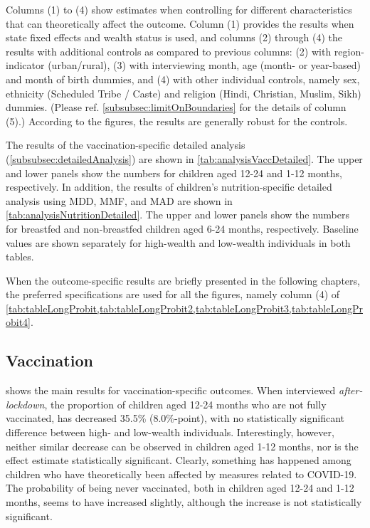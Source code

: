 \documentclass[12pt,a4paper,notitlepage]{article}
\begin{document}
Columns (1) to (4) show estimates when controlling for different characteristics that can theoretically affect the outcome. Column (1) provides the results when state fixed effects and wealth status is used, and columns (2) through (4) the results with additional controls as compared to previous columns: (2) with region-indicator (urban/rural), (3) with interviewing month, age (month- or year-based) and month of birth dummies, and (4) with other individual controls, namely sex, ethnicity (Scheduled Tribe /  Caste) and religion (Hindi, Christian, Muslim, Sikh) dummies. (Please ref. \cref{subsubsec:limitOnBoundaries} for the details of column (5).) According to the figures, the results are generally robust for the controls.

The results of the vaccination-specific detailed analysis (\cref{subsubsec:detailedAnalysis}) are shown in \cref{tab:analysisVaccDetailed}. The upper and lower panels show the numbers for children aged 12-24 and 1-12 months, respectively. In addition, the results of children's nutrition-specific detailed analysis using MDD, MMF, and MAD are shown in \cref{tab:analysisNutritionDetailed}. The upper and lower panels show the numbers for breastfed and non-breastfed children aged 6-24 months, respectively. Baseline values are shown separately for high-wealth and low-wealth individuals in both tables.

When the outcome-specific results are briefly presented in the following chapters, the preferred specifications are used for all the figures, namely column (4) of \cref{tab:tableLongProbit,tab:tableLongProbit2,tab:tableLongProbit3,tab:tableLongProbit4}.

\subsection{Vaccination} \label{subsec:resultsVaccination}

 shows the main results for vaccination-specific outcomes. When interviewed \textit{after-lockdown}, the proportion of children aged 12-24 months who are not fully vaccinated, has decreased 35.5\% (8.0\%-point), with no statistically significant difference between high- and low-wealth individuals. Interestingly, however, neither similar decrease can be observed in children aged 1-12 months, nor is the effect estimate statistically significant. Clearly, something has happened among children who have theoretically been affected by measures related to COVID-19. The probability of being never vaccinated, both in children aged 12-24 and 1-12 months, seems to have increased slightly, although the increase is not statistically significant.
\end{document}
